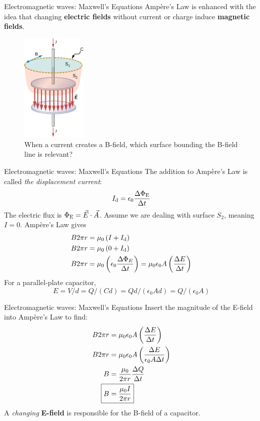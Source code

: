 \documentclass{beamer}
\begin{document}
\begin{frame}{Electromagnetic waves: Maxwell's Equations}
Amp\`{e}re's Law is enhanced with the idea that changing \textbf{electric fields} without current or charge induce \textbf{magnetic fields}.
\begin{figure}
\centering
\includegraphics[width=0.275\textwidth]{figures/displacement_current.png}
\caption{\label{fig:disp_current} When a current creates a B-field, which surface bounding the B-field line is relevant?}
\end{figure}
\end{frame}

\begin{frame}{Electromagnetic waves: Maxwell's Equations}
\small
The addition to Amp\`{e}re's Law is called \textit{the displacement current}:
\begin{equation}
I_{\rm d} = \epsilon_0 \frac{\Delta \Phi_{\rm E}}{\Delta t}
\end{equation}
The electric flux is $\Phi_{\rm E} = \vec{E} \cdot \vec{A}$.  Assume we are dealing with surface $S_2$, meaning $I = 0$.  Amp\`{e}re's Law gives
\begin{align}
B 2\pi r &= \mu_0\left(I + I_{\rm d}\right) \\
B 2\pi r &= \mu_0\left(0 + I_{\rm d}\right) \\
B 2\pi r &= \mu_0\left(\epsilon_0 \frac{\Delta \Phi_E}{\Delta t} \right) = \mu_0\epsilon_0 A\left(\frac{\Delta E}{\Delta t}\right)
\end{align}
For a parallel-plate capacitor,
\begin{equation}
E = V/d = Q/(Cd) = Qd/(\epsilon_0 A d) = Q/(\epsilon_0 A)
\end{equation}
\end{frame}

\begin{frame}{Electromagnetic waves: Maxwell's Equations}
Insert the magnitude of the E-field into Amp\`{e}re's Law to find:
\begin{align}
B 2\pi r &= \mu_0\epsilon_0 A\left(\frac{\Delta E}{\Delta t}\right) \\
B 2\pi r &= \mu_0\epsilon_0 A \left(\frac{\Delta E}{\epsilon_0 A \Delta t}\right) \\
B &= \frac{\mu_0}{2\pi r} \frac{\Delta Q}{\Delta t} \\
\Aboxed{ B &= \frac{\mu_0 I}{2\pi r} }
\end{align}
A \textit{changing} \textbf{\alert{E-field}} is responsible for the B-field of a capacitor.
\end{frame}
\end{document}
